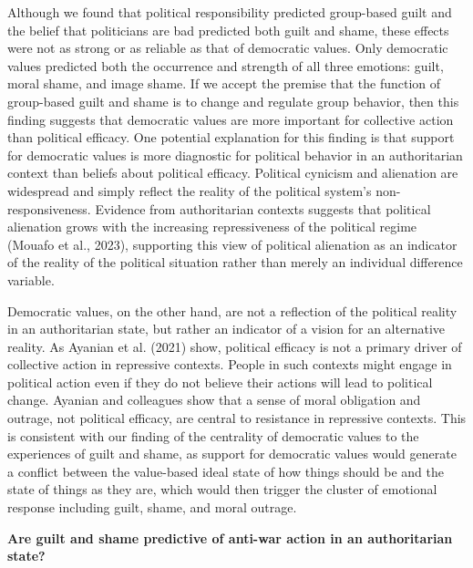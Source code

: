\documentclass[
]{article}
\begin{document}
Although we found that political responsibility predicted group-based guilt and the belief that politicians are bad predicted both guilt and shame, these effects were not as strong or as reliable as that of democratic values. Only democratic values predicted both the occurrence and strength of all three emotions: guilt, moral shame, and image shame. If we accept the premise that the function of group-based guilt and shame is to change and regulate group behavior, then this finding suggests that democratic values are more important for collective action than political efficacy. One potential explanation for this finding is that support for democratic values is more diagnostic for political behavior in an authoritarian context than beliefs about political efficacy. Political cynicism and alienation are widespread and simply reflect the reality of the political system's non-responsiveness. Evidence from authoritarian contexts suggests that political alienation grows with the increasing repressiveness of the political regime (Mouafo et al., 2023), supporting this view of political alienation as an indicator of the reality of the political situation rather than merely an individual difference variable.

Democratic values, on the other hand, are not a reflection of the political reality in an authoritarian state, but rather an indicator of a vision for an alternative reality. As Ayanian et al. (2021) show, political efficacy is not a primary driver of collective action in repressive contexts. People in such contexts might engage in political action even if they do not believe their actions will lead to political change. Ayanian and colleagues show that a sense of moral obligation and outrage, not political efficacy, are central to resistance in repressive contexts. This is consistent with our finding of the centrality of democratic values to the experiences of guilt and shame, as support for democratic values would generate a conflict between the value-based ideal state of how things should be and the state of things as they are, which would then trigger the cluster of emotional response including guilt, shame, and moral outrage.

\textbf{Are guilt and shame predictive of anti-war action in an authoritarian state?}
\end{document}

